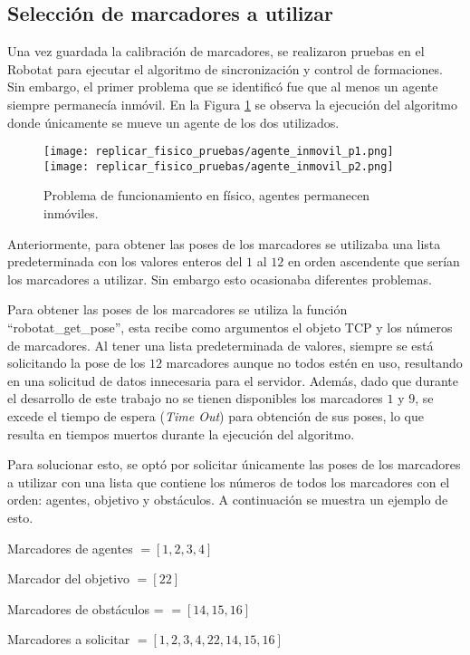 \subsection{Selección de marcadores a utilizar}
Una vez guardada la calibración de marcadores, se realizaron pruebas en el Robotat para ejecutar el algoritmo de sincronización y control de formaciones. Sin embargo, el primer problema que se identificó fue que al menos un agente siempre permanecía inmóvil. En la Figura \ref{fig:agente_inmovil} se observa la ejecución del algoritmo donde únicamente se mueve un agente de los dos utilizados.

\begin{figure}[H]
	\centering
	\texttt{[image: replicar\_fisico\_pruebas/agente\_inmovil\_p1.png]}
	\texttt{[image: replicar\_fisico\_pruebas/agente\_inmovil\_p2.png]}
	\caption{Problema de funcionamiento en físico, agentes permanecen inmóviles.}
	\label{fig:agente_inmovil}
\end{figure}

Anteriormente, para obtener las poses de los marcadores se utilizaba una lista predeterminada con los valores enteros del $1$ al $12$ en orden ascendente que serían los marcadores a utilizar. Sin embargo esto ocasionaba diferentes problemas.

Para obtener las poses de los marcadores se utiliza la función ``robotat\_get\_pose'', esta recibe como argumentos el objeto TCP y los números de marcadores. Al tener una lista predeterminada de valores, siempre se está solicitando la pose de los $12$ marcadores aunque no todos estén en uso, resultando en una solicitud de datos innecesaria para el servidor. Además, dado que durante el desarrollo de este trabajo no se tienen disponibles los marcadores $1$ y $9$, se excede el tiempo de espera (\textit{Time Out}) para obtención de sus poses, lo que resulta en tiempos muertos durante la ejecución del algoritmo.

Para solucionar esto, se optó por solicitar únicamente las poses de los marcadores a utilizar con una lista que contiene los números de todos los marcadores con el orden: agentes, objetivo y obstáculos. A continuación se muestra un ejemplo de esto.

Marcadores de agentes $= [1, 2, 3, 4]$

Marcador del objetivo $ = [22]$

Marcadores de obstáculos = $ = [14, 15, 16]$

Marcadores a solicitar $ = [1, 2, 3, 4, 22, 14, 15, 16]$

